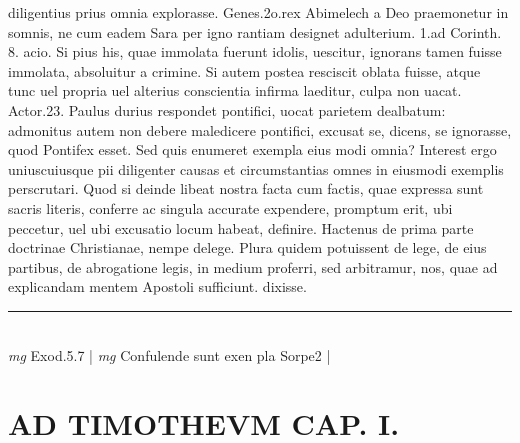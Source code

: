 \documentclass{article}
\begin{document}
\begin{pages}
diligentius prius omnia explorasse. Genes.2o.rex Abimelech a Deo praemonetur in somnis, ne cum eadem Sara per igno rantiam designet adulterium. 1.ad Corinth. 8. acio. Si pius his, quae immolata fuerunt idolis, uescitur, ignorans tamen fuisse immolata, absoluitur a crimine. Si autem   postea resciscit oblata fuisse, atque  tunc uel propria uel alterius conscientia infirma laeditur, culpa non uacat. Actor.23. Paulus durius respondet pontifici, uocat parietem dealbatum: admonitus autem non debere maledicere pontifici, excusat se, dicens, se ignorasse, quod Pontifex esset. Sed quis enumeret exempla eius modi omnia? Interest ergo uniuscuiusque pii diligenter causas et circumstantias omnes in eiusmodi exemplis perscrutari. Quod si deinde libeat nostra facta cum factis, quae expressa sunt sacris literis, conferre ac singula accurate expendere, promptum erit, ubi peccetur, uel ubi excusatio locum habeat, definire. Hactenus de prima parte doctrinae Christianae, nempe delege. Plura quidem potuissent de lege, de eius partibus, de abrogatione legis, in medium proferri, sed arbitramur, nos, quae ad explicandam mentem Apostoli sufficiunt. dixisse.  \pend
\vspace{0.5cm}\noindent
\vspace{0.2cm}\rule{1cm}{0.2pt}\\ 
\hspace{0.2cm}\textit{mg}
\footnotesize Exod.5.7 
\normalsize| 
\hspace{0.2cm}\textit{mg}
\footnotesize Confulende sunt exen pla Sorpe2 
\normalsize| 
\section*{AD TIMOTHEVM CAP. I. }
\marginpar{[ p.44 ]}
{}

\end{pages}
\end{document}

